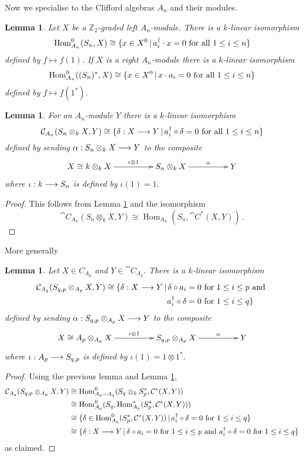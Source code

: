 \documentclass[english,letter paper,12pt,leqno]{article}
\newtheorem{lemma}[theorem]{Lemma}
\theoremstyle{example}
\numberwithin{equation}{section}
\def\Hom{\operatorname{Hom}}
\begin{document}
Now we specialise to the Clifford algebras $A_n$ and their modules.

\begin{lemma}\label{lemma:simplehom} Let $X$ be a $\mathbb{Z}_2$-graded left $A_n$-module. There is a $k$-linear isomorphism
\[
\Hom_{A_n}^0( S_n, X ) \cong \{ x \in X^0 \l a_i^\dagger \cdot x = 0 \text{ for all } 1 \le i \le n \}
\]
defined by $f \mapsto f(1)$. If $X$ is a right $A_n$-module there is a $k$-linear isomorphism
\[
\Hom^0_{A_n}( (S_n)^*, X ) \cong \{ x \in X^0 \l x \cdot a_i = 0 \text{ for all } 1 \le i \le n \}
\]
defined by $f \mapsto f(1^*)$.
\end{lemma}

\begin{lemma}\label{lemma:morphism_out_1} For an $A_n$-module $Y$ there is a $k$-linear isomorphism
\[
\mathcal{C}_{A_n}( S_n \otimes_k X, Y ) \cong \{ \delta: X \longrightarrow Y \,|\, a_i^\dagger \circ \delta = 0 \text{ for all } 1 \le i \le n \}
\]
defined by sending $\alpha: S_n \otimes_k X \longrightarrow Y$ to the composite
\[
\xymatrix@C+2pc{
X \cong k \otimes_k X \ar[r]^-{\iota \otimes 1} & S_n \otimes_k X \ar[r]^-{\alpha} & Y
}
\]
where $\iota: k \longrightarrow S_n$ is defined by $\iota(1) = 1$.
\end{lemma}
\begin{proof}
This follows from Lemma \ref{lemma:simplehom} and the isomorphism
\[
\cat{C}_{A_n}(S_n \otimes_k X, Y ) \cong \Hom_{A_n}( S_n, \cat{C}^*(X,Y) )\,.
\]
\end{proof}

More generally

\begin{lemma}\label{lemma:morphisms_two_forms} Let $X \in C_{A_p}$ and $Y \in \cat{C}_{A_q}$. There is a $k$-linear isomorphism
\begin{align*}
\mathcal{C}_{A_q}( S_{q,p} \otimes_{A_p} X, Y ) \cong \{ \delta: X \longrightarrow Y \,|\, \delta \circ a_i &= 0 \text{ for } 1 \le i \le p \text{ and }\\ a_i^\dagger \circ \delta &= 0 \text{ for } 1 \le i \le q \}
\end{align*}
defined by sending $\alpha: S_{q,p} \otimes_{A_p} X \longrightarrow Y$ to the composite
\[
\xymatrix@C+2pc{
X \cong A_p \otimes_{A_p} X \ar[r]^-{\iota \otimes 1} & S_{q,p} \otimes_{A_p} X \ar[r]^-{\alpha} & Y
}
\]
where $\iota: A_p \longrightarrow S_{q,p}$ is defined by $\iota(1) = 1 \otimes 1^*$.
\end{lemma}
\begin{proof}
Using the previous lemma and Lemma \ref{lemma:simplehom},
\begin{align*}
\cat{C}_{A_q}( S_{q,p} \otimes_{A_p} X, Y ) &\cong \Hom^0_{A_p-A_q}( S_{q} \otimes_k S_p^* , \cat{C}^*(X,Y))\\
&\cong \Hom^0_{A_q}( S_q, \Hom^*_{A_p}( S_p^*, \cat{C}^*(X,Y) ))\\
&\cong \{ \delta \in \Hom^0_{A_q}( S_p^*, \cat{C}^*(X,Y) ) \l a_i^\dagger \circ \delta = 0 \text{ for } 1 \le i \le q \}\\
&\cong \{ \delta: X \lto Y \l \delta \circ a_i = 0 \text{ for } 1 \le i \le p \text{ and } a_i^\dagger \circ \delta = 0 \text{ for } 1 \le i \le q \}
\end{align*}
as claimed.
\end{proof}
\end{document}
